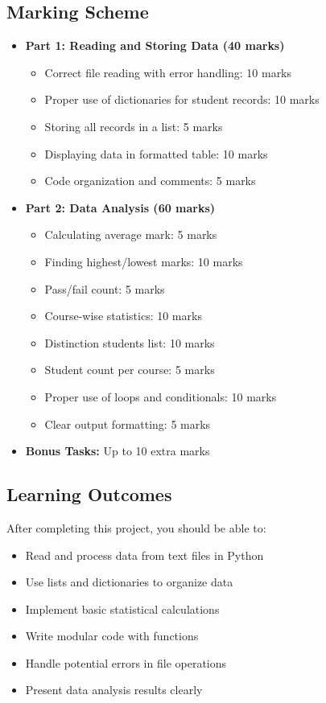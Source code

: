\documentclass[a4paper,11pt]{article}
\theoremstyle{mytheor}
\begin{document}
\subsection*{Marking Scheme}

\begin{itemize}
    \item \textbf{Part 1: Reading and Storing Data (40 marks)}
    \begin{itemize}
        \item Correct file reading with error handling: 10 marks
        \item Proper use of dictionaries for student records: 10 marks
        \item Storing all records in a list: 5 marks
        \item Displaying data in formatted table: 10 marks
        \item Code organization and comments: 5 marks
    \end{itemize}
    
    \item \textbf{Part 2: Data Analysis (60 marks)}
    \begin{itemize}
        \item Calculating average mark: 5 marks
        \item Finding highest/lowest marks: 10 marks
        \item Pass/fail count: 5 marks
        \item Course-wise statistics: 10 marks
        \item Distinction students list: 10 marks
        \item Student count per course: 5 marks
        \item Proper use of loops and conditionals: 10 marks
        \item Clear output formatting: 5 marks
    \end{itemize}
    
    \item \textbf{Bonus Tasks:} Up to 10 extra marks
\end{itemize}

\subsection*{Learning Outcomes}

After completing this project, you should be able to:

\begin{itemize}
    \item Read and process data from text files in Python
    \item Use lists and dictionaries to organize data
    \item Implement basic statistical calculations
    \item Write modular code with functions
    \item Handle potential errors in file operations
    \item Present data analysis results clearly
\end{itemize}
\end{document}
